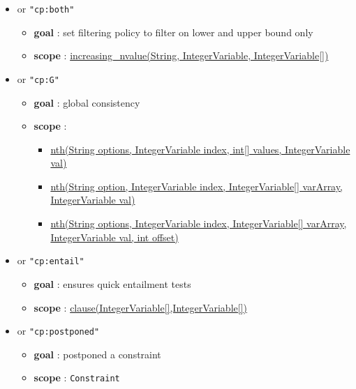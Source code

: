 \begin{itemize}
\begin{itemize}
		\end{itemize}		
		\item \label{cinvboth:cinvbothoptions}\hypertarget{cinvboth:cinvbothoptions}{}		
		 or \texttt{"cp:both"}
		\begin{itemize}
				\item \textbf{goal} : set filtering policy to filter on lower and upper bound only
				\item \textbf{scope} : \hyperlink{increasingnvalue:increasingnvalueconstraint}{increasing\_nvalue(String, IntegerVariable, IntegerVariable[])}
		\end{itemize}
		\item \label{cnthg:cnthgoptions}\hypertarget{cnthg:cnthgoptions}{}		
		 or \texttt{"cp:G"}
		\begin{itemize}
				\item \textbf{goal} : global consistency
				\item \textbf{scope} : 
					\begin{itemize}
						\item \hyperlink{nth:nthconstraint}{nth(String options, IntegerVariable index, int[] values, IntegerVariable val)}
						\item \hyperlink{nth:nthconstraint}{nth(String option, IntegerVariable index, IntegerVariable[] varArray, IntegerVariable val)}
						\item \hyperlink{nth:nthconstraint}{nth(String options, IntegerVariable index, IntegerVariable[] varArray, IntegerVariable val, int offset)}
					\end{itemize}				
		\end{itemize}
		\item \label{cclause:cclauseoptions}\hypertarget{cclause:cclauseoptions}{}		
		 or \texttt{"cp:entail"}
		\begin{itemize}
				\item \textbf{goal} : ensures quick entailment tests
				\item \textbf{scope} : \hyperlink{clause:clauseconstraint}{clause(IntegerVariable[],IntegerVariable[])}
		\end{itemize}
		\item \label{cpostponed:cpostponedoptions}\hypertarget{cpostponed:cpostponedoptions}{}		
		 or \texttt{"cp:postponed"}
		\begin{itemize}
				\item \textbf{goal} : postponed a constraint
				\item \textbf{scope} : \texttt{Constraint}
		\end{itemize}


\end{itemize}
